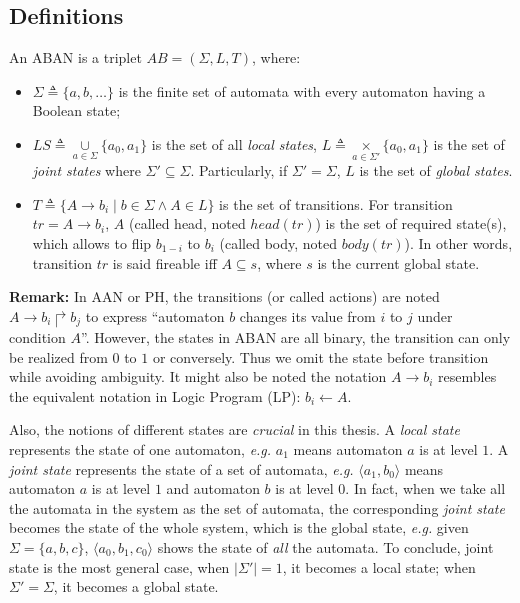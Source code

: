 \subsection{Definitions}
\begin{definition}[ABAN]\label{def:ABAN}
An ABAN is a triplet $AB = (\Sigma,L,T)$, where:
\begin{itemize}
\item $\Sigma\triangleq\{a,b,\ldots\}$ is the finite set of automata with every automaton having a Boolean state;
\item $LS\triangleq \underset{a\in \Sigma}{\cup} \{a_0,a_1\}$ is the set of all \textit{local states}, $L\triangleq \underset{a\in \Sigma'}{\times} \{a_0,a_1\}$ is the set of \textit{joint states} where $\Sigma'\subseteq\Sigma$. Particularly, if $\Sigma'=\Sigma$, $L$ is the set of \textit{global states}. 
\item $T\triangleq \{A\rightarrow b_i\mid b\in \Sigma \land A\in L\}$ is the set of transitions.
For transition $tr=A\to b_i$, $A$ (called head, noted $head(tr)$) is the set of required state(s), which allows to flip $b_{1-i}$ to $b_i$ (called body, noted $body(tr)$). In other words, transition $tr$ is said fireable iff $A\subseteq s$, where $s$ is the current global state. 
\end{itemize}
\end{definition}

\textbf{Remark:} In AAN or PH, the transitions (or called actions) are noted $A\rightarrow b_i\Rsh b_j$ to express ``automaton $b$ changes its value from $i$ to $j$ under condition $A$''.
However, the states in ABAN are all binary, the transition can only be realized from $0$ to $1$ or conversely.
Thus we omit the state before transition while avoiding ambiguity.
It might also be noted the notation $A\rightarrow b_i$ resembles the equivalent notation in Logic Program (LP): $b_i \leftarrow A$.

Also, the notions of different states are \textit{crucial} in this thesis.
A \textit{local state} represents the state of one automaton, \textit{e.g.} $a_1$ means automaton $a$ is at level $1$.
A \textit{joint state} represents the state of a set of automata, \textit{e.g.} $\langle a_1, b_0\rangle$ means automaton $a$ is at level $1$ and automaton $b$ is at level $0$.
In fact, when we take all the automata in the system as the set of automata, the corresponding \textit{joint state} becomes the state of the whole system, which is the global state, \textit{e.g.} given $\Sigma =\{a,b,c\}$, $\langle a_0, b_1,c_0 \rangle$ shows the state of \textit{all} the automata.
To conclude, joint state is the most general case, when $|\Sigma'|=1$, it becomes a local state;
when $\Sigma'=\Sigma$, it becomes a global state.

